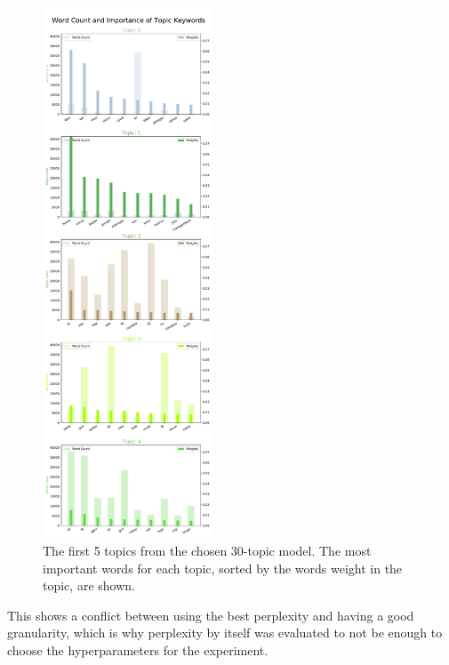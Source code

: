 \begin{figure}[h]
	\centering
	\includegraphics[width=0.45\textwidth]{figures/Word count and importance_corpus2017_final_model(30, 0.1, 0.1)(30, 0.1, 0.1)_topic 0-4.pdf}
	\caption{The first 5 topics from the chosen 30-topic model.
		The most important words for each topic, sorted by the words weight in the topic, are shown.}
	\label{fig:30TopicWords}
\end{figure}

This shows a conflict between using the best perplexity and having a good granularity, which is why perplexity by itself was evaluated to not be enough to choose the hyperparameters for the experiment.
